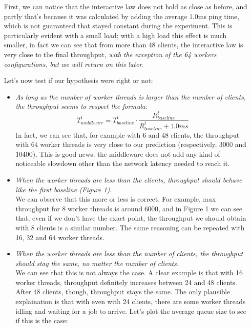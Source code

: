 \documentclass[11pt,a4paper]{article}
\begin{document}
First, we can notice that the interactive law does not hold as close as before, and partly that's because it was calculated
by adding the average 1.0ms ping time, which is not guaranteed that stayed constant during the experiment. This is particularly evident with a small load; with a high load this effect is much smaller, in fact we can see that from more than 48 clients, the interactive law is very close to the final throughput, \emph{with the exception of the 64 workers configurations, but we will return on this later}.

Let's now test if our hypothesis were right or not: 
\begin{itemize}
	\item \emph{As long as the number of worker threads is larger than the number of clients, the throughput seems to respect the formula}:
	$$
		T_{middlware}^t = T_{baseline}^t \cdot \frac{R_{baseline}^t}{R_{baseline}^t + 1.0ms}
	$$
		In fact, we can see that, for example with 6 and 48 clients, the throughput with 64 worker threads is very close to our prediction (respectively, 3000 and 10400). This is good news: the middleware does not add any kind of noticeable slowdown other than the network latency needed to reach it.
	\item \emph{When the worker threads are less than the clients, throughput should behave like the first baseline (Figure 1)}.\\
		We can observe that this more or less is correct.
		For example, max throughput for 8 worker threads is around 6000, and in Figure 1 we can see that, even if we don't have the exact point, the throughput we should obtain with 8 clients is a similar number. The same reasoning can be repeated with 16, 32 and 64 worker threads. 
	\item \emph{When the worker threads are less than the number of clients, the throughput should stay the same, no matter the
		number of clients.}\\
		We can see that this is not always the case. A clear example is that with 16 worker threads, throughput definitely 
		increases between 24 and 48 clients. After 48 clients, though, throughput stays the same. 
		The only plausible explaination is that with even with 24 clients, there are some worker threads idling and waiting
		for a job to arrive. Let's plot the average queue size to see if this is the case:
		\begin{figure}[H]
			\begin{subfigure}[b]{0.25\linewidth}
				\emph{ }
			\end{subfigure}

\end{figure}
\end{itemize}
\end{document}
